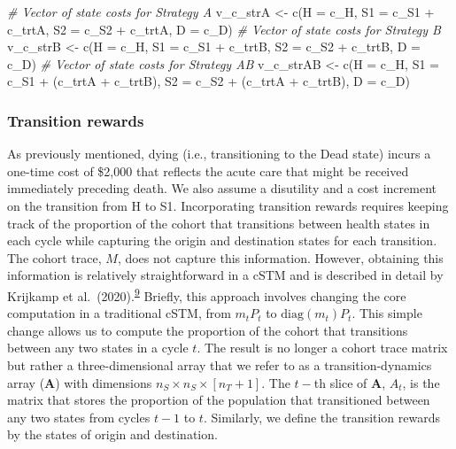 \documentclass[
]{article}
\newenvironment{Shaded}{\begin{snugshade}}{\end{snugshade}}
\newcommand{\AttributeTok}[1]{\textcolor[rgb]{0.77,0.63,0.00}{#1}}
\newcommand{\CommentTok}[1]{\textcolor[rgb]{0.56,0.35,0.01}{\textit{#1}}}
\newcommand{\FunctionTok}[1]{\textcolor[rgb]{0.00,0.00,0.00}{#1}}
\newcommand{\NormalTok}[1]{#1}
\newcommand{\OtherTok}[1]{\textcolor[rgb]{0.56,0.35,0.01}{#1}}
\newcommand{\SpecialCharTok}[1]{\textcolor[rgb]{0.00,0.00,0.00}{#1}}
\begin{document}
\begin{Shaded}
\begin{Highlighting}[]
\CommentTok{\# Vector of state costs for Strategy A}
\NormalTok{v\_c\_strA }\OtherTok{\textless{}{-}} \FunctionTok{c}\NormalTok{(}\AttributeTok{H  =}\NormalTok{ c\_H, }
              \AttributeTok{S1 =}\NormalTok{ c\_S1 }\SpecialCharTok{+}\NormalTok{ c\_trtA, }
              \AttributeTok{S2 =}\NormalTok{ c\_S2 }\SpecialCharTok{+}\NormalTok{ c\_trtA, }
              \AttributeTok{D  =}\NormalTok{ c\_D)}
\CommentTok{\# Vector of state costs for Strategy B}
\NormalTok{v\_c\_strB }\OtherTok{\textless{}{-}} \FunctionTok{c}\NormalTok{(}\AttributeTok{H  =}\NormalTok{ c\_H, }
              \AttributeTok{S1 =}\NormalTok{ c\_S1 }\SpecialCharTok{+}\NormalTok{ c\_trtB, }
              \AttributeTok{S2 =}\NormalTok{ c\_S2 }\SpecialCharTok{+}\NormalTok{ c\_trtB, }
              \AttributeTok{D  =}\NormalTok{ c\_D)}
\CommentTok{\# Vector of state costs for Strategy AB}
\NormalTok{v\_c\_strAB }\OtherTok{\textless{}{-}} \FunctionTok{c}\NormalTok{(}\AttributeTok{H  =}\NormalTok{ c\_H, }
               \AttributeTok{S1 =}\NormalTok{ c\_S1 }\SpecialCharTok{+}\NormalTok{ (c\_trtA }\SpecialCharTok{+}\NormalTok{ c\_trtB), }
               \AttributeTok{S2 =}\NormalTok{ c\_S2 }\SpecialCharTok{+}\NormalTok{ (c\_trtA }\SpecialCharTok{+}\NormalTok{ c\_trtB), }
               \AttributeTok{D  =}\NormalTok{ c\_D)}
\end{Highlighting}
\end{Shaded}

\hypertarget{transition-rewards}{%
\subsubsection{Transition rewards}\label{transition-rewards}}

As previously mentioned, dying (i.e., transitioning to the Dead state) incurs a one-time cost of \$2,000 that reflects the acute care that might be received immediately preceding death. We also assume a disutility and a cost increment on the transition from H to S1. Incorporating transition rewards requires keeping track of the proportion of the cohort that transitions between health states in each cycle while capturing the origin and destination states for each transition. The cohort trace, \(M\), does not capture this information. However, obtaining this information is relatively straightforward in a cSTM and is described in detail by Krijkamp et al.~(2020).\textsuperscript{\protect\hyperlink{ref-Krijkamp2019}{9}} Briefly, this approach involves changing the core computation in a traditional cSTM, from \(m_t P_t\) to \(\text{diag}(m_t) P_t\). This simple change allows us to compute the proportion of the cohort that transitions between any two states in a cycle \(t\). The result is no longer a cohort trace matrix but rather a three-dimensional array that we refer to as a transition-dynamics array (\(\mathbf{A}\)) with dimensions \(n_S \times n_S \times [n_T+1]\). The \(t-\)th slice of \(\mathbf{A}\), \(A_t\), is the matrix that stores the proportion of the population that transitioned between any two states from cycles \(t-1\) to \(t\). Similarly, we define the transition rewards by the states of origin and destination.
\end{document}
